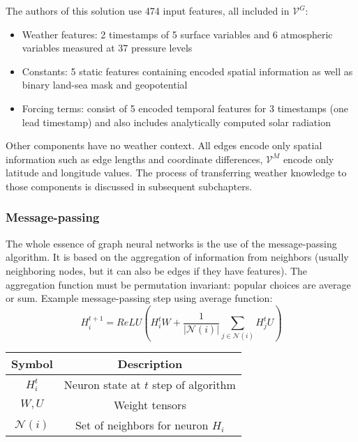 The authors of this solution use 474 input features, all included in $\mathcal{V}^{G}$:
\begin{itemize}
    \item Weather features: 2 timestamps of 5 surface variables and 6 atmospheric variables measured at 37 pressure levels
    \item Constants: 5 static features containing encoded spatial information as well as binary land-sea mask and geopotential
    \item Forcing terms: consist of 5 encoded temporal features for 3 timestamps (one lead timestamp) and also includes analytically computed solar radiation
\end{itemize}

Other components have no weather context. All edges encode only spatial information such as edge lengths and coordinate differences, $\mathcal{V}^M$ encode only latitude and longitude values. The process of transferring weather knowledge to those components is discussed in subsequent subchapters.

\subsubsection{Message-passing} 
The whole essence of graph neural networks is the use of the message-passing algorithm. It is based on the aggregation of information from neighbors (usually neighboring nodes, but it can also be edges if they have features). The aggregation function must be permutation invariant: popular choices are average or sum. Example message-passing step using average function:
\[
    H_i^{t+1} = ReLU\left(H_i^t W  + \frac{1}{|\mathcal{N}(i)|} \sum_{j \in \mathcal{N}(i)} H_j^t U\right)
\]
\begin{table}[!ht]
    \centering
    \begin{tabular}{|c|c|}
        \hline
        Symbol & Description \\
        \hline
        $H_i^t$& Neuron state at $t$ step of algorithm \\
        $W,U$ & Weight tensors \\
        $\mathcal{N}(i)$ & Set of neighbors for neuron $H_i$ \\
        \hline
    \end{tabular}
\end{table}

